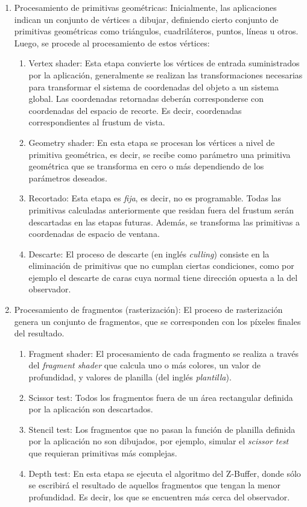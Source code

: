 \begin{enumerate}
	\item Procesamiento de primitivas geométricas:
		Inicialmente, las aplicaciones indican un conjunto de vértices a dibujar, definiendo cierto conjunto de primitivas geométricas como triángulos, cuadriláteros, puntos, líneas u otros. Luego, se procede al procesamiento de estos vértices:
		\begin{enumerate}
			\item Vertex shader: Esta etapa convierte los vértices de entrada suministrados por la aplicación, generalmente se realizan las transformaciones necesarias para transformar el sistema de coordenadas del objeto a un sistema global. Las coordenadas retornadas deberán corresponderse con coordenadas del espacio de recorte. Es decir, coordenadas correspondientes al frustum de vista.
			\item Geometry shader: En esta etapa se procesan los vértices a nivel de primitiva geométrica, es decir, se recibe como parámetro una primitiva geométrica que se transforma en cero o más dependiendo de los parámetros deseados.
			\item Recortado: Esta etapa es \textit{fija}, es decir, no es programable. Todas las primitivas calculadas anteriormente que residan fuera del frustum serán descartadas en las etapas futuras. Además, se transforma las primitivas a coordenadas de espacio de ventana.
			\item Descarte: El proceso de descarte (en inglés \textit{culling}) consiste en la eliminación de primitivas que no cumplan ciertas condiciones, como por ejemplo el descarte de caras cuya normal tiene dirección opuesta a la del observador.
		\end{enumerate}
	\item Procesamiento de fragmentos (rasterización):
		El proceso de rasterización genera un conjunto de fragmentos, que se corresponden con los píxeles finales del resultado.
		\begin{enumerate}
			\item Fragment shader: El procesamiento de cada fragmento se realiza a través del \textit{fragment shader} que calcula uno o más colores, un valor de profundidad, y valores de planilla (del inglés \textit{plantilla}).
			\item Scissor test: Todos los fragmentos fuera de un área rectangular definida por la aplicación son descartados.
			\item Stencil test: Los fragmentos que no pasan la función de planilla definida por la aplicación no son dibujados, por ejemplo, simular el \textit{scissor test} que requieran primitivas más complejas.
			\item Depth test: En esta etapa se ejecuta el algoritmo del Z-Buffer, donde sólo se escribirá el resultado de aquellos fragmentos que tengan la menor profundidad. Es decir, los que se encuentren más cerca del observador.
		\end{enumerate}
\end{enumerate}

